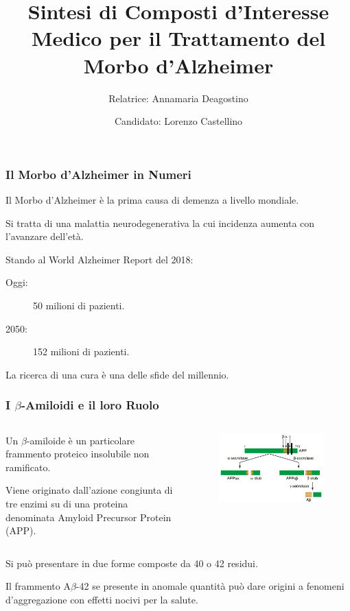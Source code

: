 \documentclass[9pt]{beamer}
\title{Sintesi di Composti d'Interesse Medico per il Trattamento del Morbo d'Alzheimer}
\author{
	Relatrice: Annamaria Deagostino
	\and
	Candidato: Lorenzo Castellino
}
\date{\center{Anno Accademico 2018-2019}}
\begin{document}
\begin{frame}
	\titlepage
\end{frame}

\begin{frame}
	\frametitle{Il Morbo d'Alzheimer in Numeri}
	Il Morbo d'Alzheimer è la prima causa di demenza a livello mondiale.

	Si tratta di una malattia neurodegenerativa la cui incidenza aumenta con l'avanzare dell'età.

	Stando al World Alzheimer Report del 2018:

	\begin{description}
		\item [Oggi:] 50 milioni di pazienti.

		\item [2050:] 152 milioni di pazienti.

	\end{description}

	La ricerca di una cura è una delle sfide del millennio.
\end{frame}

\begin{frame}
	\frametitle{I $\beta$-Amiloidi e il loro Ruolo}
	\bigskip
	\begin{columns}
		\begin{column}{0.5\textwidth}
			Un $\beta$-amiloide è un particolare frammento proteico insolubile non ramificato.

			\smallskip
			Viene originato dall'azione congiunta di tre enzimi su di una proteina denominata Amyloid Precursor Protein (APP).
		\end{column}
		\begin{column}{0.5\textwidth}

			\begin{figure}
				\includegraphics[width=\textwidth]{immagini/APP.png}
			\end{figure}
		\end{column}
	\end{columns}

	\medskip
	Si può presentare in due forme composte da 40 o 42 residui.

	Il frammento A$\beta$-42 se presente in anomale quantità può dare origini a fenomeni d'aggregazione con effetti nocivi per la salute.

\end{frame}
\end{document}
